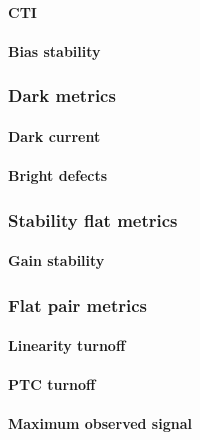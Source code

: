 \paragraph{CTI}\label{cti-1}

\paragraph{Bias stability}\label{bias-stability-1}

\subsubsection{Dark metrics}\label{dark-metrics-2}

\paragraph{Dark current}\label{dark-current-2}

\paragraph{Bright defects}\label{bright-defects-2}

\subsubsection{Stability flat metrics}\label{stability-flat-metrics-2}

\paragraph{Gain stability}\label{gain-stability-1}

\subsubsection{Flat pair metrics}\label{flat-pair-metrics-2}

\paragraph{Linearity turnoff}\label{linearity-turnoff-1}

\paragraph{PTC turnoff}\label{ptc-turnoff-1}

\paragraph{Maximum observed signal}\label{maximum-observed-signal-1}

